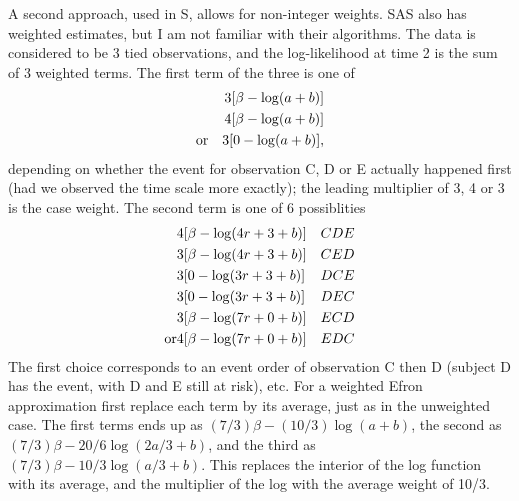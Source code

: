 \documentclass[11pt]{article}
\begin{document}
A second approach, used in S, allows for non-integer weights.
SAS also has weighted estimates, but I am not familiar with their algorithms.
The data is considered to be 3 tied observations, and the
log-likelihood at time 2 is the sum of 3 weighted terms.
The first term of the three is one of
\begin{eqnarray*}
	&& 3 [\beta - \log(a+b)]	\\
	&& 4 [\beta - \log(a+b)]     \\
 &{\rm or}&3 [0 - \log(a+b)],
\end{eqnarray*}
depending on whether the event for observation C, D or E 
actually happened first
(had we observed the time scale more exactly); 
the leading multiplier of 3, 4  or
3 is the case weight.
The second term is one of 6 possiblities
\begin{eqnarray*}
	& 4 [\beta - \log(4r+3+b)]  & CDE \\
        & 3 [\beta - \log(4r+3+b)]  & CED \\	
	& 3 [0 -     \log(3r+3+b)]  & DCE\\
	& 3 [0     - \log(3r+3+b)]  & DEC \\
        & 3 [\beta - \log(7r+0+b)]  & ECD\\
{\rm or}	& 4 [\beta - \log(7r+0+b)]  & EDC
\end{eqnarray*}
The first choice corresponds to an event order of observation C then D
(subject D has the event, with D and E still at risk), etc.
For a weighted Efron approximation first replace each term by its average,
just as in the unweighted case.
The first terms ends up as $(7/3)\beta - (10/3)\log(a+b)$,
the second as $(7/3)\beta - 20/6\log(2a/3 + b)$, and the third
as $(7/3) \beta - 10/3\log(a/3 +b)$. 
This replaces the interior of the log function with its average, and the
multiplier of the log with the average weight of 10/3.
\end{document}
